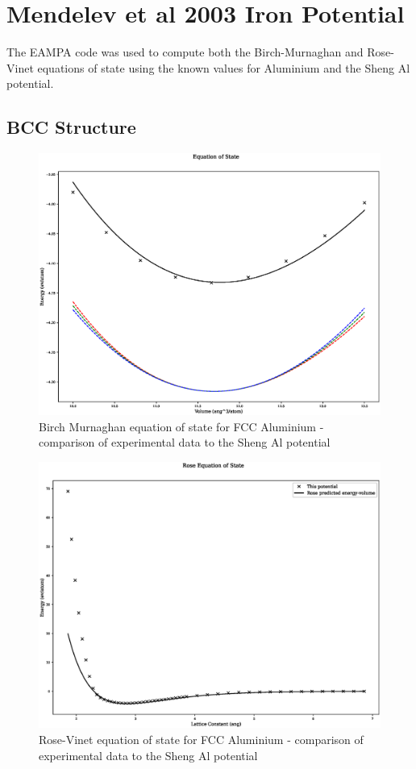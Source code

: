 \section{Mendelev et al 2003 Iron Potential}

The EAMPA code was used to compute both the Birch-Murnaghan and Rose-Vinet equations of state using the known values for Aluminium and the Sheng Al potential\cite{femendelev}.  

\subsection{BCC Structure}
 
\begin{figure}
  \begin{center}
    \includegraphics[width=0.6\linewidth]{appendix/transferability/transferability/Fe_mhsasa/equation_of_state_bp_bcc.eps}
  \end{center}
	\caption{Birch Murnaghan equation of state for FCC Aluminium - comparison of experimental data to the Sheng Al potential}
	\label{fig:shengalfccbm}
\end{figure}

\begin{figure}
  \begin{center}
    \includegraphics[width=0.6\linewidth]{appendix/transferability/transferability/Fe_mhsasa/rose_plot_bp_bcc.eps}
  \end{center}
	\caption{Rose-Vinet equation of state for FCC Aluminium - comparison of experimental data to the Sheng Al potential}
	\label{fig:shengalfccbm}
\end{figure}

